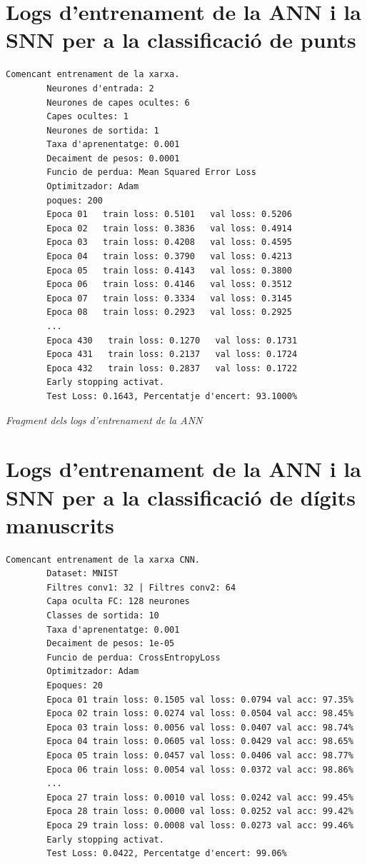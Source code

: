 \documentclass[a4paper,11pt, titlepage, twoside]{article}
\begin{document}
\begin{appendices}
	\section*{Logs d'entrenament de la ANN i la SNN per a la classificació de punts}
	\vspace{3mm}
	\begin{lstlisting}[style=logs, captionpos=b, label={lst:logs_ann}]
		Comencant entrenament de la xarxa.
		Neurones d'entrada: 2
		Neurones de capes ocultes: 6
		Capes ocultes: 1
		Neurones de sortida: 1
		Taxa d'aprenentatge: 0.001
		Decaiment de pesos: 0.0001
		Funcio de perdua: Mean Squared Error Loss
		Optimitzador: Adam
		poques: 200
		Epoca 01   train loss: 0.5101   val loss: 0.5206
		Epoca 02   train loss: 0.3836   val loss: 0.4914
		Epoca 03   train loss: 0.4208   val loss: 0.4595
		Epoca 04   train loss: 0.3790   val loss: 0.4213
		Epoca 05   train loss: 0.4143   val loss: 0.3800
		Epoca 06   train loss: 0.4146   val loss: 0.3512
		Epoca 07   train loss: 0.3334   val loss: 0.3145
		Epoca 08   train loss: 0.2923   val loss: 0.2925
		...
		Epoca 430   train loss: 0.1270   val loss: 0.1731
		Epoca 431   train loss: 0.2137   val loss: 0.1724
		Epoca 432   train loss: 0.2837   val loss: 0.1722
		Early stopping activat.
		Test Loss: 0.1643, Percentatje d'encert: 93.1000%
	\end{lstlisting}
	\vspace{-0.4cm}
	\begin{center}
		\small\textit{Fragment dels logs d'entrenament de la ANN}
	\end{center}
	\vspace{5mm}
	\section*{Logs d'entrenament de la ANN i la SNN per a la classificació de dígits manuscrits}
	\vspace{3mm}
	\begin{lstlisting}[style=logs, captionpos=b, label={lst:logs_ann}]
		Comencant entrenament de la xarxa CNN.
		Dataset: MNIST
		Filtres conv1: 32 | Filtres conv2: 64
		Capa oculta FC: 128 neurones
		Classes de sortida: 10
		Taxa d'aprenentatge: 0.001
		Decaiment de pesos: 1e-05
		Funcio de perdua: CrossEntropyLoss
		Optimitzador: Adam
		Epoques: 20
		Epoca 01 train loss: 0.1505 val loss: 0.0794 val acc: 97.35%
		Epoca 02 train loss: 0.0274 val loss: 0.0504 val acc: 98.45%
		Epoca 03 train loss: 0.0056 val loss: 0.0407 val acc: 98.74%
		Epoca 04 train loss: 0.0605 val loss: 0.0429 val acc: 98.65%
		Epoca 05 train loss: 0.0457 val loss: 0.0406 val acc: 98.77%
		Epoca 06 train loss: 0.0054 val loss: 0.0372 val acc: 98.86%
		...
		Epoca 27 train loss: 0.0010 val loss: 0.0242 val acc: 99.45%
		Epoca 28 train loss: 0.0000 val loss: 0.0252 val acc: 99.42%
		Epoca 29 train loss: 0.0008 val loss: 0.0273 val acc: 99.46%
		Early stopping activat.
		Test Loss: 0.0422, Percentatge d'encert: 99.06%


\end{lstlisting}
\end{appendices}
\end{document}
